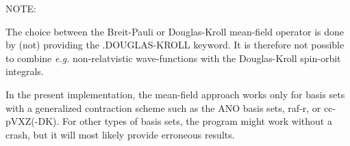 \begin{description}
NOTE:  

The choice between the Breit-Pauli or Douglas-Kroll mean-field operator 
is done by (not) providing the .DOUGLAS-KROLL keyword. It is therefore 
not possible to combine {\it e.g.\/} non-relatvistic wave-functions with the 
Douglas-Kroll spin-orbit integrals. 


In the present implementation, the mean-field approach works only for basis sets 
with a generalized contraction scheme such as the ANO basis sets, raf-r, or cc-pVXZ(-DK).
For other types of basis sets, the program might work without a crash, but it
will most likely provide erroneous results.  



\end{description}



